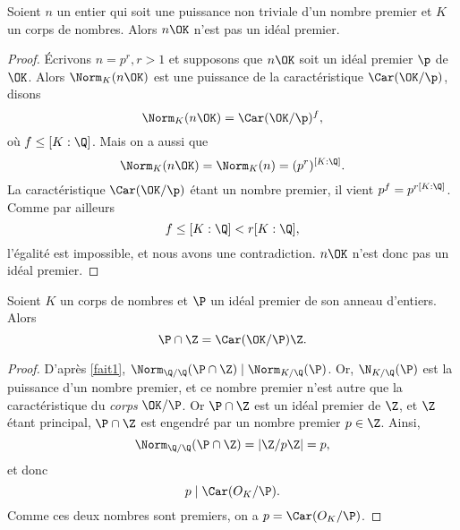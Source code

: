 \documentclass[a4paper, 12pt, oneside]{article}
\begin{document}
\begin{fait}
Soient $n$ un entier qui soit une puissance non triviale d'un nombre premier et $ K$ un corps de nombres. Alors $n\OK$ n'est pas un idéal premier.
\end{fait}

\begin{proof}
Écrivons $n = p^r, r>1$ et supposons que $n\OK$ soit un idéal premier $\p$ de $\OK$. Alors $\Norm_K(n\OK)$ est une puissance de la caractéristique $\Car(\OK/\p)$, disons $$\Norm_K(n\OK) = \Car(\OK/\p)^f,$$ où $f \leq [K : \Q]$. Mais on a aussi que $$\Norm_K(n\OK) = \Norm_K(n) = (p^r)^{[K : \Q]}.$$ La caractéristique $\Car(\OK/\p)$ étant un nombre premier, il vient $p^f = p^{r[K : \Q]}$. Comme par ailleurs $$f \leq [K : \Q] < r[K : \Q],$$ l'égalité est impossible, et nous avons une contradiction. $n\OK$ n'est donc pas un idéal premier.
\end{proof}

\begin{fait} Soient $K$ un corps de nombres et $\P$ un idéal premier de son anneau d'entiers. Alors $$\P\cap \Z = \Car(\OK/\P)\Z.$$
\end{fait}

\begin{proof}
	D'après \ref{fait1}, $\Norm_{\Q/\Q}(\P\cap\Z)\mid \Norm_{K/\Q}(\P)$. Or, $\N_{K/\Q}(\P)$ est la puissance d'un nombre premier, et ce nombre premier n'est autre que la caractéristique du \textit{corps} $\OK/\P$. Or $\P\cap \Z$ est un idéal premier de $\Z$, et $\Z$ étant principal, $\P\cap \Z$ est engendré par un nombre premier $p\in \Z$. Ainsi, $$\Norm_{\Q/\Q}(\P\cap \Z) = |\Z/p\Z| = p,$$ et donc $$p\mid \Car(O_K/\P).$$ Comme ces deux nombres sont premiers, on a $p = \Car(O_K/\P)$.
\end{proof}

\nocite{*}
\printbibliography
\end{document}
